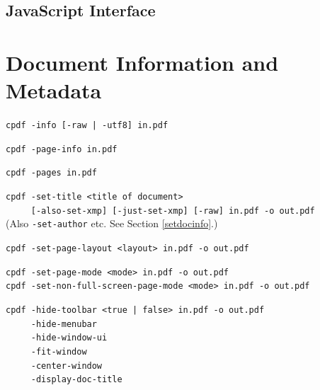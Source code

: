 \documentclass{book}
\begin{document}
\begin{jscpdflib}
\clearpage
\section*{JavaScript Interface}
\begin{small}\tt

\end{small}
\end{jscpdflib}

\chapter{Document Information and Metadata}\label{chap:11}
  \begin{framed}

    \small\noindent\verb!cpdf -info [-raw | -utf8] in.pdf!

    \vspace{1.5mm}
    \small\noindent\verb!cpdf -page-info in.pdf!

    \vspace{1.5mm}
    \small\noindent\verb!cpdf -pages in.pdf!

    \vspace{1.5mm}
    \small\noindent\verb!cpdf -set-title <title of document>!\\
    \small\noindent\verb!     [-also-set-xmp] [-just-set-xmp] [-raw] in.pdf -o out.pdf!\\
    (Also \texttt{-set-author} etc. See Section \ref{setdocinfo}.)

    \vspace{1.5mm}
    \small\noindent\verb!cpdf -set-page-layout <layout> in.pdf -o out.pdf!

    \vspace{1.5mm}
    \small\noindent\verb!cpdf -set-page-mode <mode> in.pdf -o out.pdf!\\
    \small\noindent\verb!cpdf -set-non-full-screen-page-mode <mode> in.pdf -o out.pdf!

    \vspace{1.5mm} 
    \small\noindent\verb!cpdf -hide-toolbar <true | false> in.pdf -o out.pdf!\\
    \noindent\verb!     -hide-menubar!\\
    \noindent\verb!     -hide-window-ui!\\
    \noindent\verb!     -fit-window!\\
    \noindent\verb!     -center-window!\\
    \noindent\verb!     -display-doc-title!
    

\end{framed}
\end{document}
